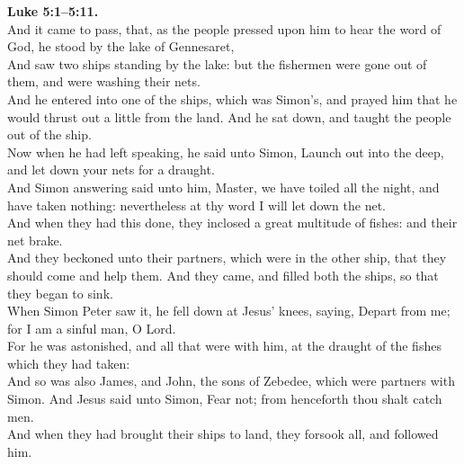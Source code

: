 \documentclass[10pt]{article} %
\begin{document}
{\begin{minipage}[t]{0.45\textwidth}
\textbf{Luke 5:1--5:11.}\\
And it came to pass, that, as the people pressed upon him to hear the word of God, he stood by the lake of Gennesaret,\\
And saw two ships standing by the lake: but the fishermen were gone out of them, and were washing their nets.\\
And he entered into one of the ships, which was Simon's, and prayed him that he would thrust out a little from the land. And he sat down, and taught the people out of the ship.\\
Now when he had left speaking, he said unto Simon, Launch out into the deep, and let down your nets for a draught.\\
And Simon answering said unto him, Master, we have toiled all the night, and have taken nothing: nevertheless at thy word I will let down the net.\\
And when they had this done, they inclosed a great multitude of fishes: and their net brake.\\
And they beckoned unto their partners, which were in the other ship, that they should come and help them. And they came, and filled both the ships, so that they began to sink.\\
When Simon Peter saw it, he fell down at Jesus' knees, saying, Depart from me; for I am a sinful man, O Lord.\\
For he was astonished, and all that were with him, at the draught of the fishes which they had taken:\\
And so was also James, and John, the sons of Zebedee, which were partners with Simon. And Jesus said unto Simon, Fear not; from henceforth thou shalt catch men.\\
And when they had brought their ships to land, they forsook all, and followed him.
\end{minipage}}
\vspace*{\fill}
\newpage
\Huge%
\vspace*{\fill}
\end{document}
